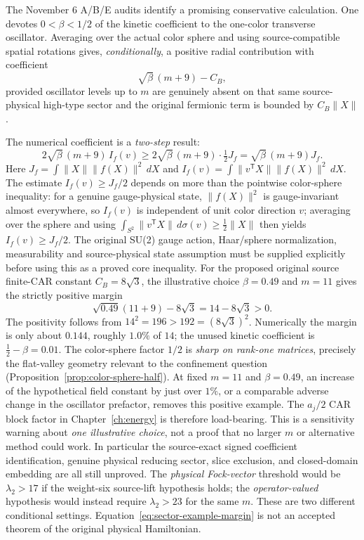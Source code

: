 The November 6 A/B/E audits identify a promising conservative
calculation. One devotes $0<\beta<1/2$ of the kinetic coefficient
to the one-color transverse oscillator. Averaging over the actual
color sphere and using source-compatible spatial rotations gives,
\emph{conditionally}, a positive radial contribution with coefficient
\begin{equation}\label{eq:sector-margin}
  \sqrt\beta\,(m+9)-C_B,
\end{equation}
provided oscillator levels up to $m$ are genuinely absent on
that same source-physical high-type sector and the original fermionic
term is bounded by $C_B\|X\|$.

The numerical coefficient is a \emph{two-step} result:
\begin{equation}\label{eq:oscillator-color-factor}
  2\sqrt\beta\,(m+9)\,I_f(v)
  \ge 2\sqrt\beta\,(m+9)\cdot\tfrac12 J_f
  =\sqrt\beta\,(m+9)J_f.
\end{equation}
Here $J_f=\int\|X\|\|f(X)\|^2\,dX$ and
$I_f(v)=\int\|v^{\mathsf T}X\|\|f(X)\|^2\,dX$.
The estimate $I_f(v)\ge J_f/2$ depends on more than the pointwise
color-sphere inequality: for a genuine gauge-physical state,
$\|f(X)\|^2$ is gauge-invariant almost everywhere, so $I_f(v)$ is
independent of unit color direction $v$; averaging over the sphere
and using $\int_{S^2}\|v^{\mathsf T}X\|\,d\sigma(v)
\ge\tfrac12\|X\|$ then yields $I_f(v)\ge J_f/2$.
The original SU(2) gauge action, Haar/sphere normalization,
measurability and source-physical state assumption must be supplied
explicitly before using this as a proved core inequality.
For the proposed original source finite-CAR constant $C_B=8\sqrt3$, the illustrative
choice $\beta=0.49$ and $m=11$ gives the strictly positive margin
\begin{equation}\label{eq:sector-example-margin}
 \sqrt{0.49}(11+9)-8\sqrt3=14-8\sqrt3>0.
\end{equation}
The positivity follows from $14^2=196>192=(8\sqrt3)^2$.
Numerically the margin is only about $0.144$, roughly $1.0\%$ of
$14$; the unused kinetic coefficient is $\frac12-\beta=0.01$.
The color-sphere factor $1/2$ is \emph{sharp on rank-one matrices},
precisely the flat-valley geometry relevant to the confinement question
(Proposition~\ref{prop:color-sphere-half}). At fixed $m=11$ and
$\beta=0.49$, an increase of the hypothetical field constant by
just over $1\%$, or a comparable adverse change in the oscillator
prefactor, removes this positive example. The $a_j/2$ CAR block factor
in Chapter~\ref{ch:energy} is therefore load-bearing.
This is a sensitivity warning about \emph{one illustrative choice},
not a proof that no larger $m$ or alternative method could work.
In particular the source-exact signed coefficient identification,
genuine physical reducing sector, slice exclusion, and closed-domain
embedding are all still unproved.
The \emph{physical Fock-vector} threshold would be
$\lambda_2>17$ if the weight-six source-lift hypothesis holds;
the \emph{operator-valued} hypothesis would instead require
$\lambda_2>23$ for the same $m$. These are two different
conditional settings. Equation~\eqref{eq:sector-example-margin}
is not an accepted theorem of the original physical Hamiltonian.


